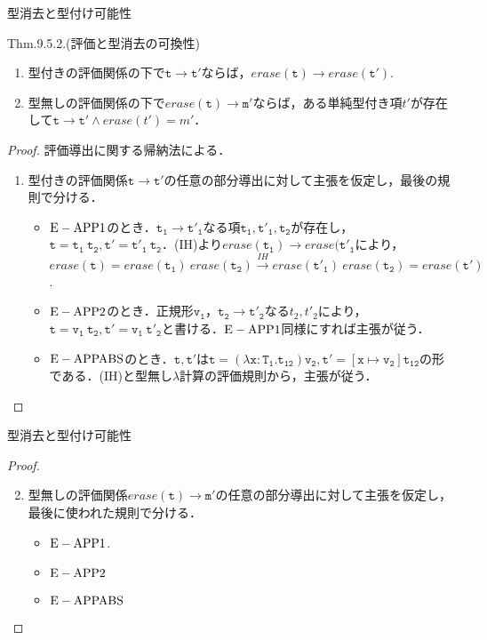 \documentclass[9pt]{beamer}
\begin{document}
\begin{frame}{型消去と型付け可能性}
\begin{alertblock}{Thm.9.5.2.(評価と型消去の可換性)}
\begin{enumerate}
\item 型付きの評価関係の下で$\mathtt{t\rightarrow t'}$ならば，$erase(\mathtt{t})\rightarrow erase(\mathtt{t'})$.
\item 型無しの評価関係の下で$erase(\mathtt{t})\rightarrow \mathtt{m'}$ならば，ある単純型付き項$t'$が存在して$\mathtt{t\rightarrow t'}\land erase(t') = m'$．
\end{enumerate}
\end{alertblock}\begin{proof}
評価導出に関する帰納法による．
\begin{enumerate}\item 型付きの評価関係$\mathtt{t\rightarrow t'}$の任意の部分導出に対して主張を仮定し，最後の規則で分ける．
\begin{itemize}\item $\tiny\rm{E-APP1}$のとき．$\mathtt{t_{1}\rightarrow t'_{1}}$なる項$\mathtt{t_{1}, t'_{1}, t_{2}}$が存在し，$\mathtt{t = t_{1}\ t_{2}, t' = t'_{1}\ t_{2}}$．(IH)より$erase(\mathtt{t_{1}})\rightarrow erase(\mathtt{t'_{1}}$により，$erase(\mathtt{t}) = erase(\mathtt{t_{1}})\ erase(\mathtt{t_{2}})\xrightarrow{IH}erase(\mathtt{t'_{1}})\ erase(\mathtt{t_{2}}) = erase(\mathtt{t'})$.
\item $\tiny\rm{E-APP2}$のとき．正規形$\mathtt{v_{1}}$，$\mathtt{t_{2}\rightarrow t'_{2}}$なる$t_{2}, t'_{2}$により，$\mathtt{t = v_{1}\ t_{2}, t' = v_{1}\ t'_{2}}$と書ける．$\tiny\rm{E-APP1}$同様にすれば主張が従う．
\item $\tiny\rm{E-APPABS}$のとき．$\mathtt{t, t'}$は$\mathtt{t = (\lambda x:T_{1}.t_{12})v_{2}, t' = \left[x\mapsto v_{2}\right]t_{12}}$の形である．(IH)と型無し$\lambda$計算の評価規則から，主張が従う．\end{itemize}
\end{enumerate}
\end{proof}
\end{frame}
\begin{frame}{型消去と型付け可能性}
\begin{proof}
\begin{enumerate}\setcounter{enumi}{1}
\item 型無しの評価関係$erase(\mathtt{t})\rightarrow \mathtt{m'}$の任意の部分導出に対して主張を仮定し，最後に使われた規則で分ける．
\begin{itemize}
\item $\tiny\rm{E-APP1}$.
\item $\tiny\rm{E-APP2}$
\item $\tiny\rm{E-APPABS}$
\end{itemize}\end{enumerate}
\end{proof}
\end{frame}
\end{document}

